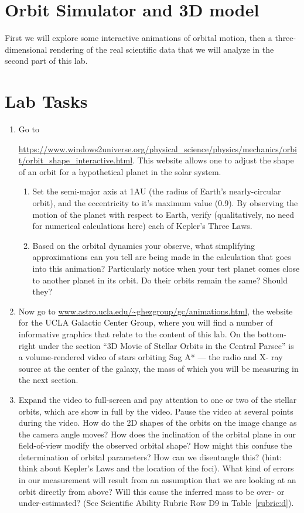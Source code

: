\section{Orbit Simulator and 3D model}

First we will explore some interactive animations of orbital motion, then a three-dimensional rendering
of the real scientific data that we will analyze in the second part of this lab.

\section{Lab Tasks}
\begin{enumerate}
	\item Go to
	
	\url{https://www.windows2universe.org/physical_science/physics/mechanics/orbit/orbit_shape_interactive.html}. This website allows one to adjust the shape of an orbit for a hypothetical planet in the solar system.

	\begin{enumerate}
		\item Set the semi-major axis at 1AU (the radius of Earth’s nearly-circular orbit), and the eccentricity to it’s maximum value (0.9). By observing the motion of the planet with respect to
		Earth, verify (qualitatively, no need for numerical calculations here) each of Kepler’s Three
		Laws.
		
		\item Based on the orbital dynamics your observe, what simplifying approximations can you tell
		are being made in the calculation that goes into this animation? Particularly notice when
		your test planet comes close to another planet in its orbit. Do their orbits remain the same?
		Should they?
	\end{enumerate}

	\item Now go to \url{www.astro.ucla.edu/~ghezgroup/gc/animations.html}, the website for the UCLA
	Galactic Center Group, where you will find a number of informative graphics that relate to the
	content of this lab. On the bottom-right under the section “3D Movie of Stellar Orbits in the Central Parsec” is a volume-rendered video of stars orbiting Sag A* --- the radio and X-
	ray source at the center of the galaxy, the mass of which you will be measuring in the next
	section.
	
	\item Expand the video to full-screen and pay attention to one or two of the stellar orbits,
	which are show in full by the video. Pause the video at several points during the video. How
	do the 2D shapes of the orbits on the image change as the camera angle moves? How does the
	inclination of the orbital plane in our field-of-view modify the observed orbital shape? How might
	this confuse the determination of orbital parameters? How can we disentangle this? (hint: think
	about Kepler’s Laws and the location of the foci). What kind of errors in our measurement will
	result from an assumption that we are looking at an orbit directly from above? Will this cause the inferred mass to be over- or under-estimated? (See Scientific Ability Rubric Row D9 in Table~\ref{rubric:d}).
	

\end{enumerate}
